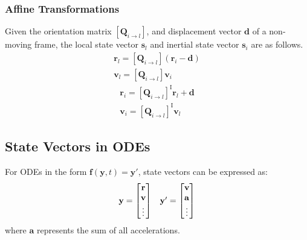 \subsubsection{Affine Transformations}
Given the orientation matrix $\left[\mathbf{Q}_{i\to l}\right]$, and displacement vector $\mathbf{d}$ of a non-moving frame,
the local state vector $\mathbf{s}_l$ and inertial state vector $\mathbf{s}_i$ are as follows.
\begin{equation}
    \begin{array}{c}
        \mathbf{r}_l = \left[\mathbf{Q}_{i\to l}\right]\left(\mathbf{r}_i - \mathbf{d}\right) \\
        \mathbf{v}_l = \left[\mathbf{Q}_{i\to l}\right]\mathbf{v}_i
    \end{array}
\end{equation}
\begin{equation}
    \begin{array}{c}
        \mathbf{r}_i = \left[\mathbf{Q}_{i\to l}\right]^\mathrm{I}\mathbf{r}_l + \mathbf{d} \\
        \mathbf{v}_i = \left[\mathbf{Q}_{i\to l}\right]^\mathrm{I}\mathbf{v}_l
    \end{array}
\end{equation}


\subsection{State Vectors in ODEs}
For ODEs in the form $\mathbf{f}\left(\mathbf{y},t\right) = \mathbf{y}'$, state vectors can be expressed as:
\begin{equation}
    \begin{array}{c c}
        \mathbf{y}=
        \begin{bmatrix}
            \mathbf{r} \\
            \mathbf{v} \\
            \vdots
        \end{bmatrix} &
        \mathbf{y}'=
        \begin{bmatrix}
            \mathbf{v} \\
            \mathbf{a} \\
            \vdots
        \end{bmatrix}
    \end{array}
\end{equation}
where $\mathbf{a}$ represents the sum of all accelerations.



